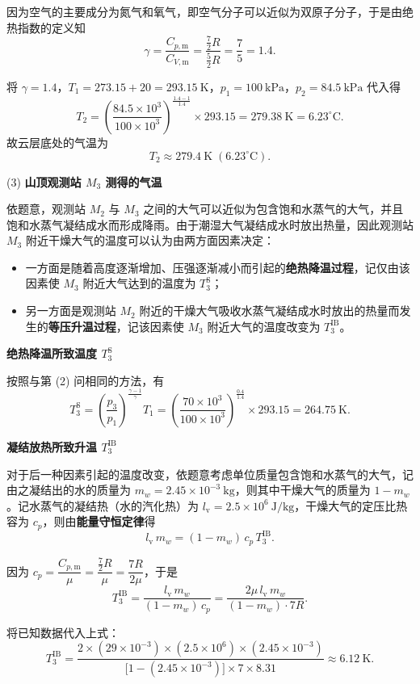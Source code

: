 \documentclass[UTF8]{ctexart}
\begin{document}
因为空气的主要成分为氮气和氧气，即空气分子可以近似为双原子分子，于是由绝热指数的定义知
\[
\gamma=\frac{C_{p,\mathrm{m}}}{C_{V,\mathrm{m}}}=\frac{\frac{7}{2}R}{\frac{5}{2}R}=\frac{7}{5}=1.4.
\]

将 $\gamma=1.4$，$T_1=273.15+20=293.15\ \mathrm{K}$，$p_1=100\ \mathrm{kPa}$，$p_2=84.5\ \mathrm{kPa}$ 代入得
\[
T_2=\left(\frac{84.5\times 10^3}{100\times 10^3}\right)^{\frac{1.4-1}{1.4}}\times 293.15
=279.38\ \mathrm{K}=6.23^{\circ}\mathrm{C}.
\]
故云层底处的气温为
\[
\boxed{T_2\approx 279.4\ \mathrm{K}\;(6.23^{\circ}\mathrm{C})}.
\]

(3) \textbf{山顶观测站 $M_3$ 测得的气温}

依题意，观测站 $M_2$ 与 $M_3$ 之间的大气可以近似为包含饱和水蒸气的大气，并且饱和水蒸气凝结成水而形成降雨。由于潮湿大气凝结成水时放出热量，因此观测站 $M_3$ 附近干燥大气的温度可以认为由两方面因素决定：

\begin{itemize}
    \item 一方面是随着高度逐渐增加、压强逐渐减小而引起的\textbf{绝热降温过程}，记仅由该因素使 $M_3$ 附近大气达到的温度为 $T_3^{\mathrm{S}}$；
    \item 另一方面是观测站 $M_2$ 附近的干燥大气吸收水蒸气凝结成水时放出的热量而发生的\textbf{等压升温过程}，记该因素使 $M_3$ 附近大气的温度改变为 $T_3^{\mathrm{IB}}$。
\end{itemize}

\textbf{绝热降温所致温度 $T_3^{\mathrm{S}}$}

按照与第 (2) 问相同的方法，有
\[
T_3^{\mathrm{S}}=\left(\frac{p_3}{p_1}\right)^{\frac{\gamma-1}{\gamma}}T_1
=\left(\frac{70\times 10^3}{100\times 10^3}\right)^{\frac{0.4}{1.4}}\times 293.15
=264.75\ \mathrm{K}.
\]

\textbf{凝结放热所致升温 $T_3^{\mathrm{IB}}$}

对于后一种因素引起的温度改变，依题意考虑单位质量包含饱和水蒸气的大气，记由之凝结出的水的质量为 $m_w=2.45\times 10^{-3}\ \mathrm{kg}$，则其中干燥大气的质量为 $1-m_w$。记水蒸气的凝结热（水的汽化热）为 $l_{\mathrm{v}}=2.5\times 10^{6}\ \mathrm{J/kg}$，干燥大气的定压比热容为 $c_p$，则由\textbf{能量守恒定律}得
\[
l_{\mathrm{v}}\,m_w=(1-m_w)\,c_p\,T_3^{\mathrm{IB}}.
\]

因为 $c_p=\dfrac{C_{p,\mathrm{m}}}{\mu}=\dfrac{\frac{7}{2}R}{\mu}=\dfrac{7R}{2\mu}$，于是
\[
T_3^{\mathrm{IB}}=\frac{l_{\mathrm{v}}\,m_w}{(1-m_w)\,c_p}
=\frac{2\mu\,l_{\mathrm{v}}\,m_w}{(1-m_w)\cdot 7R}.
\]

将已知数据代入上式：
\[
T_3^{\mathrm{IB}}=\frac{2\times(29\times 10^{-3})\times(2.5\times 10^{6})\times(2.45\times 10^{-3})}
{\bigl[1-(2.45\times 10^{-3})\bigr]\times 7\times 8.31}
\approx 6.12\ \mathrm{K}.
\]
\end{document}
